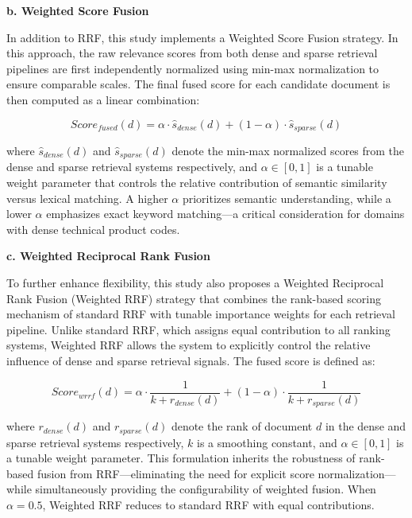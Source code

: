 \textbf{b. Weighted Score Fusion }

In addition to RRF, this study implements a Weighted Score Fusion strategy. In this approach, the raw relevance scores from both dense and sparse retrieval pipelines are first independently normalized using min-max normalization to ensure comparable scales. The final fused score for each candidate document is then computed as a linear combination:

\begin{equation*}
    Score_{fused}(d) = \alpha \cdot \hat{s}_{dense}(d) + (1 - \alpha) \cdot \hat{s}_{sparse}(d)
\end{equation*}

where $\hat{s}_{dense}(d)$ and $\hat{s}_{sparse}(d)$ denote the min-max normalized scores from the dense and sparse retrieval systems respectively, and $\alpha \in [0, 1]$ is a tunable weight parameter that controls the relative contribution of semantic similarity versus lexical matching. A higher $\alpha$ prioritizes semantic understanding, while a lower $\alpha$ emphasizes exact keyword matching—a critical consideration for domains with dense technical product codes.

\textbf{c. Weighted Reciprocal Rank Fusion}

To further enhance flexibility, this study also proposes a Weighted Reciprocal Rank Fusion (Weighted RRF) strategy that combines the rank-based scoring mechanism of standard RRF with tunable importance weights for each retrieval pipeline. Unlike standard RRF, which assigns equal contribution to all ranking systems, Weighted RRF allows the system to explicitly control the relative influence of dense and sparse retrieval signals. The fused score is defined as:

\begin{equation*}
    Score_{wrrf}(d) = \alpha \cdot \frac{1}{k + r_{dense}(d)} + (1 - \alpha) \cdot \frac{1}{k + r_{sparse}(d)}
\end{equation*}

where $r_{dense}(d)$ and $r_{sparse}(d)$ denote the rank of document $d$ in the dense and sparse retrieval systems respectively, $k$ is a smoothing constant, and $\alpha \in [0, 1]$ is a tunable weight parameter. This formulation inherits the robustness of rank-based fusion from RRF—eliminating the need for explicit score normalization—while simultaneously providing the configurability of weighted fusion. When $\alpha = 0.5$, Weighted RRF reduces to standard RRF with equal contributions.

